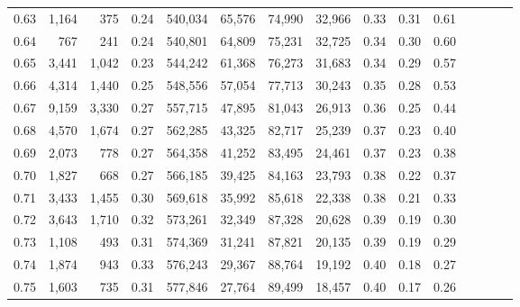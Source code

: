\begin{tabular}{rrrcrrrrrrrrrrr}
0.63 &   1,164 &    375 &                                       0.24 &  540,034 &   65,576 &   74,990 &   32,966 &  0.33 &  0.31 &                         0.61 \\
0.64 &     767 &    241 &                                       0.24 &  540,801 &   64,809 &   75,231 &   32,725 &  0.34 &  0.30 &                         0.60 \\
0.65 &   3,441 &  1,042 &                                       0.23 &  544,242 &   61,368 &   76,273 &   31,683 &  0.34 &  0.29 &                         0.57 \\
0.66 &   4,314 &  1,440 &                                       0.25 &  548,556 &   57,054 &   77,713 &   30,243 &  0.35 &  0.28 &                         0.53 \\
0.67 &   9,159 &  3,330 &                                       0.27 &  557,715 &   47,895 &   81,043 &   26,913 &  0.36 &  0.25 &                         0.44 \\
0.68 &   4,570 &  1,674 &                                       0.27 &  562,285 &   43,325 &   82,717 &   25,239 &  0.37 &  0.23 &                         0.40 \\
0.69 &   2,073 &    778 &                                       0.27 &  564,358 &   41,252 &   83,495 &   24,461 &  0.37 &  0.23 &                         0.38 \\
0.70 &   1,827 &    668 &                                       0.27 &  566,185 &   39,425 &   84,163 &   23,793 &  0.38 &  0.22 &                         0.37 \\
0.71 &   3,433 &  1,455 &                                       0.30 &  569,618 &   35,992 &   85,618 &   22,338 &  0.38 &  0.21 &                         0.33 \\
0.72 &   3,643 &  1,710 &                                       0.32 &  573,261 &   32,349 &   87,328 &   20,628 &  0.39 &  0.19 &                         0.30 \\
0.73 &   1,108 &    493 &                                       0.31 &  574,369 &   31,241 &   87,821 &   20,135 &  0.39 &  0.19 &                         0.29 \\
0.74 &   1,874 &    943 &                                       0.33 &  576,243 &   29,367 &   88,764 &   19,192 &  0.40 &  0.18 &                         0.27 \\
0.75 &   1,603 &    735 &                                       0.31 &  577,846 &   27,764 &   89,499 &   18,457 &  0.40 &  0.17 &                         0.26 \\

\end{tabular}
